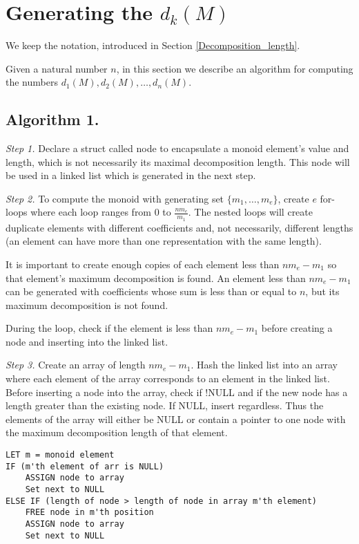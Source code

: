 \chapter{Generating the $d_k(M)$}

We keep the notation, introduced in Section \ref{Decomposition_length}.

Given a natural number $n$, in this section we describe an algorithm for computing the numbers $d_1(M),d_2(M),\ldots,d_n(M)$.

\section{Algorithm 1.}\label{Algorithm 1}

\medskip\noindent\emph{Step 1.} Declare a struct called node to encapsulate a monoid element's value and length, which is not necessarily its maximal decomposition length. This node will be used in a linked list which is generated in the next step. 

\medskip\noindent\emph{Step 2.} To compute the monoid with generating set $\{m_1, \ldots, m_e\}$, create $e$ for-loops where each loop ranges from 0 to $\frac{nm_e}{m_1}$. The nested loops will create duplicate elements with different coefficients and, not necessarily, different lengths (an element can have more than one representation with the same length). 

It is important to create enough copies of each element less than $nm_e - m_1$ so that element's maximum decomposition is found. An element less than $nm_e - m_1$ can be generated with coefficients whose sum is less than or equal to $n$, but its maximum decomposition is not found. 

During the loop, check if the element is less than $nm_e - m_1$ before creating a node and inserting into the linked list. 

\medskip\noindent\emph{Step 3.} Create an array of length $nm_e - m_1$. Hash the linked list into an array where each element of the array corresponds to an element in the linked list. Before inserting a node into the array, check if !NULL and if the new node has a length greater than the existing node. If NULL, insert regardless. Thus the elements of the array will either be NULL or contain a pointer to one node with the maximum decomposition length of that element. 

\begin{verbatim}
LET m = monoid element
IF (m'th element of arr is NULL)
    ASSIGN node to array
    Set next to NULL
ELSE IF (length of node > length of node in array m'th element)
    FREE node in m'th position
    ASSIGN node to array
    Set next to NULL
\end{verbatim}


